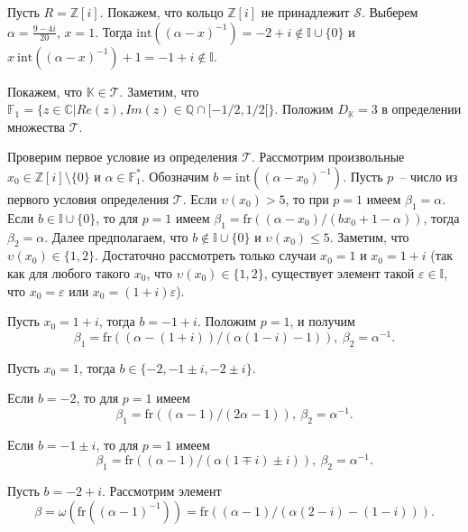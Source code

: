 \documentclass[_00_dissertation.tex]{subfiles}
\begin{document}
\begin{example}\label{example:Z[i]}
    Пусть $R = \mathbb{Z}[i]$.
    Покажем, что кольцо $\mathbb{Z}[i]$ не принадлежит $\mathcal{S}.$
    Выберем $\alpha=\frac{9-4i}{20}$, $x=1$.
    Тогда $\textrm{int}((\alpha-x)^{-1})=-2+i \notin \mathbb{I} \cup \{0\}$ и $x \ \textrm{int}((\alpha-x)^{-1})+1=-1+i \notin \mathbb{I}.$

    Покажем, что $\mathbb{K}\in\mathcal{T}$.
    Заметим, что $\mathbb{F}_1=\{z\in\mathbb{C}|Re(z),Im(z)\in\mathbb{Q}\cap[-1/2,1/2[\}$.
    Положим $D_{\mathbb{K}}=3$ в определении множества $\mathcal{T}$.

    Проверим первое условие из определения $\mathcal{T}$.
    Рассмотрим произвольные $x_0\in\mathbb{Z}[i]\setminus\{0\}$ и $\alpha\in\mathbb{F}^*_1$.
    Обозначим $b=\textrm{int}((\alpha-x_0)^{-1})$.
    Пусть $p$~-- число из первого условия определения $\mathcal{T}$.
    Если $\upsilon(x_0)>5$, то при $p=1$ имеем $\beta_1=\alpha$.
    Если $b\in\mathbb{I}\cup\{0\}$, то для $p=1$ имеем $\beta_1=\textrm{fr}((\alpha-x_0)/(bx_0+1-\alpha))$, тогда $\beta_2=\alpha$.
    Далее предполагаем, что $b\not\in\mathbb{I}\cup\{0\}$ и $\upsilon(x_0)\le 5$.
    Заметим, что $\upsilon(x_0)\in\{1,2\}$.
    Достаточно рассмотреть только случаи $x_0=1$ и $x_0=1+i$ (так как для любого такого $x_0$, что $\upsilon(x_0)\in\{1,2\}$, существует элемент такой $\varepsilon\in\mathbb{I}$, что $x_0=\varepsilon$ или $x_0=(1+i)\varepsilon$).

    Пусть $x_0=1+i$, тогда $b=-1+i$.
    Положим $p=1$, и получим
    \begin{equation*}
        \beta_1=\textrm{fr}((\alpha-(1+i))/(\alpha(1-i)-1)),\ \beta_2=\alpha^{-1}.
    \end{equation*}

    Пусть $x_0=1$, тогда $b\in\{-2,-1\pm i,-2\pm i\}$.

    Если $b=-2$, то для $p=1$ имеем
    \begin{equation*}
        \beta_1=\textrm{fr}((\alpha-1)/(2\alpha-1)),\ \beta_2=\alpha^{-1}.
    \end{equation*}

    Если $b=-1\pm i$, то для $p=1$ имеем
    \begin{equation*}
        \beta_1=\textrm{fr}((\alpha-1)/(\alpha(1\mp i)\pm i)),\ \beta_2=\alpha^{-1}.
    \end{equation*}

    Пусть $b=-2+i$. Рассмотрим элемент
    \begin{equation*}
        \beta=\omega(\textrm{fr}((\alpha-1)^{-1}))=\textrm{fr}((\alpha-1)/(\alpha(2-i)-(1-i))).
    \end{equation*}


\end{example}
\end{document}
